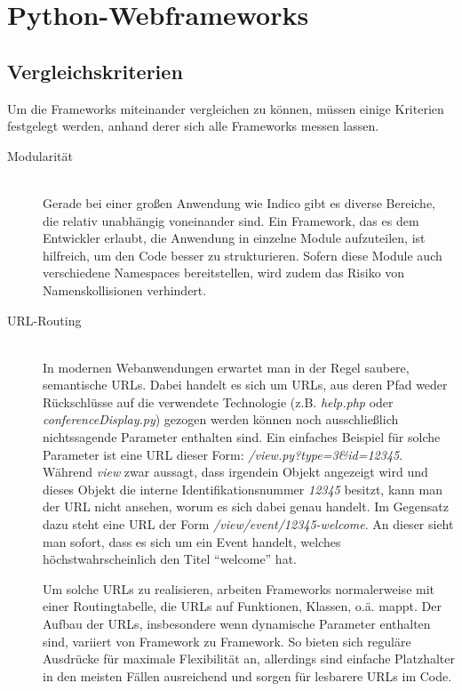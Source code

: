 \chapter{Python-Webframeworks}

\section{Vergleichskriterien}
Um die Frameworks miteinander vergleichen zu können, müssen einige Kriterien festgelegt werden,
anhand derer sich alle Frameworks messen lassen.

\begin{description}
\item[Modularität] \hfill \\
Gerade bei einer großen Anwendung wie Indico gibt es diverse Bereiche, die relativ unabhängig
voneinander sind. Ein Framework, das es dem Entwickler erlaubt, die Anwendung in einzelne Module
aufzuteilen, ist hilfreich, um den Code besser zu strukturieren. Sofern diese Module auch
verschiedene Namespaces bereitstellen, wird zudem das Risiko von Namenskollisionen verhindert.

\item[URL-Routing] \hfill \\
In modernen Webanwendungen erwartet man in der Regel saubere, semantische URLs. Dabei handelt es
sich um URLs, aus deren Pfad weder Rückschlüsse auf die verwendete Technologie (z.B. \emph{help.php}
oder \emph{conferenceDisplay.py}) gezogen werden können noch ausschließlich nichtssagende Parameter
enthalten sind. Ein einfaches Beispiel für solche Parameter ist eine URL dieser Form:
\emph{/view.py?type=3\&id=12345}. Während \emph{view} zwar aussagt, dass irgendein Objekt angezeigt
wird und dieses Objekt die interne Identifikationsnummer \emph{12345} besitzt, kann man der URL
nicht ansehen, worum es sich dabei genau handelt. Im Gegensatz dazu steht eine URL der Form
\emph{/view/event/12345-welcome}. An dieser sieht man sofort, dass es sich um ein Event handelt,
welches höchstwahrscheinlich den Titel \enquote{welcome} hat.

Um solche URLs zu realisieren, arbeiten Frameworks normalerweise mit einer Routingtabelle, die URLs
auf Funktionen, Klassen, o.ä. mappt. Der Aufbau der URLs, insbesondere wenn dynamische Parameter
enthalten sind, variiert von Framework zu Framework. So bieten sich reguläre Ausdrücke für maximale
Flexibilität an, allerdings sind einfache Platzhalter in den meisten Fällen ausreichend und sorgen
für lesbarere URLs im Code.


\end{description}
